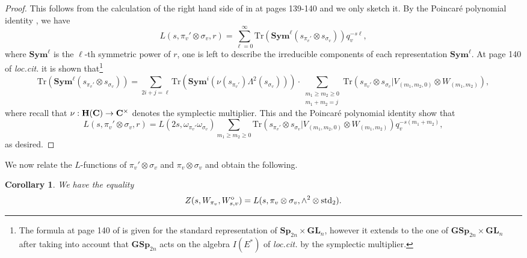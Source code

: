 \documentclass[11pt, reqno]{amsart}
\theoremstyle{plain}
\newtheorem{cor}[theorem]{Corollary}
\theoremstyle{definition}
\theoremstyle{remark}
\theoremstyle{plain}
\def\C{{\bf C}}
\def\H{{H}}
\def\H{\mathbf{H}}
\def\GSp{{\mathbf{GSp}}}
\def\Sp{{\mathbf{Sp}}}
\def\GL{\mathbf{GL}}
\begin{document}
\begin{proof}
This follows from the calculation of the right hand side of \cite[(A.1.1)]{ExplicitGSR} in \cite[Proof of Proposition A.1]{ExplicitGSR} at pages 139-140 and we only sketch it. By the Poincar\'e polynomial identity \cite[(A.1.2)]{ExplicitGSR}, we have 
\[L(s,\pi_v' \otimes \sigma_v, r) = \sum_{\ell = 0}^{\infty}\mathrm{Tr}(\mathbf{Sym}^\ell(s_{\pi_v'} \otimes s_{\sigma_v}))q_v^{-s\ell},\]
where $\mathbf{Sym}^\ell$ is the $\ell$-th symmetric power of $r$, one is left to describe the irreducible components of each representation $\mathbf{Sym}^\ell$. At page 140 of \emph{loc.cit.} it is shown that\footnote{The formula at page 140 of \cite{ExplicitGSR} is given for the standard representation of $\Sp_{2n} \times \GL_n$, however it extends to the one of $\GSp_{2n} \times \GL_n$ after taking into account that $\GSp_{2n}$ acts on the algebra $I(E^*)$ of \textit{loc.cit.} by the symplectic multiplier.}
\[ \mathrm{Tr}(\mathbf{Sym}^\ell(s_{\pi_v'} \otimes s_{\sigma_v})) = \sum_{2 i + j = \ell}  \mathrm{Tr}( \mathbf{Sym}^i( \nu(s_{\pi_v'})\Lambda^2( s_{\sigma_v}))) \cdot \sum_{\substack{m_1\geq m_2 \geq 0 \\  m_1 + m_2 = j }} \mathrm{Tr}(s_{\pi_v'}\otimes s_{\sigma_v}|V_{(m_1,m_2,0)} \otimes W_{(m_1,m_2)}), \]
where recall that $\nu:\H(\C) \to \C^\times$ denotes the symplectic multiplier. 
This and the Poincar\'e polynomial identity show that 
 \[L(s,\pi_v'\otimes \sigma_v, r) = L(2s,\omega_{\pi_v'}\omega_{\sigma_v}) \sum_{m_1\geq m_2\geq 0}\mathrm{Tr}(s_{\pi_v'}\otimes s_{\sigma_v}|V_{(m_1,m_2,0)} \otimes W_{(m_1,m_2)})q_v^{-s (m_1+m_2)},\]
as desired.
\end{proof}


\noindent We now relate the $L$-functions of $\pi_v' \otimes \sigma_v$ and $\pi_v \otimes \sigma_v$ and obtain the following.

\begin{cor}\label{ZtoLtensorNonSplit}
We have the equality 
\[Z(s,W_{\pi_v},W_{s,v}^{\rm o}) = L(s,\pi_v \otimes \sigma_v, \wedge^2 \otimes  \mathrm{std}_2). \]   
\end{cor}
\end{document}
